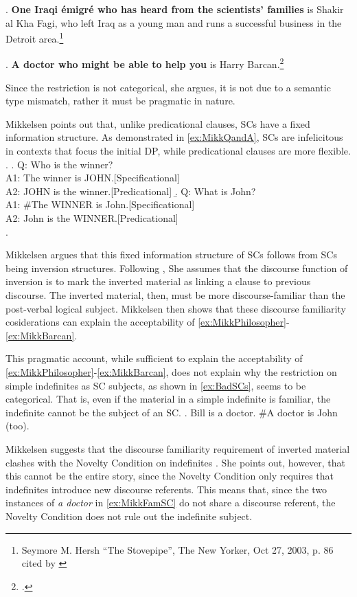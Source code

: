 \documentclass[GPFinal]{subfiles}
\begin{document}
\ex.\label{ex:MikkEmigre} \textbf{One Iraqi \'emigr\'e who has heard from the scientists' families} is Shakir al Kha Fagi, who left Iraq as a young man and runs a successful business in the Detroit area.\footnote{Seymore M. Hersh ``The Stovepipe'', The New Yorker, Oct 27, 2003, p. 86 cited by \textcite{mikkelsen2004specifying}}

\ex.\label{ex:MikkBarcan} \textbf{A doctor who might be able to help you} is Harry Barcan.\footcite{mikkelsen2004specifying}

Since the restriction is not categorical, she argues, it is not due to a semantic type mismatch, rather it must be pragmatic in nature.

Mikkelsen points out that, unlike predicational clauses, SCs have a fixed information structure.
As demonstrated in \ref{ex:MikkQandA}, SCs are infelicitous in contexts that focus the initial DP, while predicational clauses are more flexible.
\ex.\label{ex:MikkQandA}
\a. Q: Who is the winner?\\
A1: The winner is JOHN.\hfill[Specificational]\\
A2: JOHN is the winner.\hfill[Predicational]
\b. Q: What is John?\\
A1: \#The WINNER is John.\hfill[Specificational]\\
A2: John is the WINNER.\hfill[Predicational]\\
\z.

Mikkelsen argues that this fixed information structure of SCs follows from SCs being inversion structures.
Following \textcite{birner1994information,birner1996discourse}, She assumes that the discourse function of inversion is to mark the inverted material as linking a clause to previous discourse.
The inverted material, then, must be more discourse-familiar than the post-verbal logical subject.
Mikkelsen then shows that these discourse familiarity cosiderations can explain the acceptability of \ref{ex:MikkPhilosopher}-\ref{ex:MikkBarcan}.

This pragmatic account, while sufficient to explain the acceptability of \ref{ex:MikkPhilosopher}-\ref{ex:MikkBarcan}, does not explain why the restriction on simple indefinites as SC subjects, as shown in \ref{ex:BadSCs}, seems to be categorical.
That is, even if the material in a simple indefinite is familiar, the indefinite cannot be the subject of an SC.
\ex.\label{ex:MikkFamSC} Bill is a doctor. \#A doctor is John (too).

Mikkelsen suggests that the discourse familiarity requirement of inverted material clashes with the Novelty Condition on indefinites \parencite{heim1982semantics}.
She points out, however, that this cannot be the entire story, since the Novelty Condition only requires that indefinites introduce new discourse referents.
This means that, since the two instances of \textit{a doctor} in \ref{ex:MikkFamSC} do not share a discourse referent, the Novelty Condition does not rule out the indefinite subject.
\end{document}
